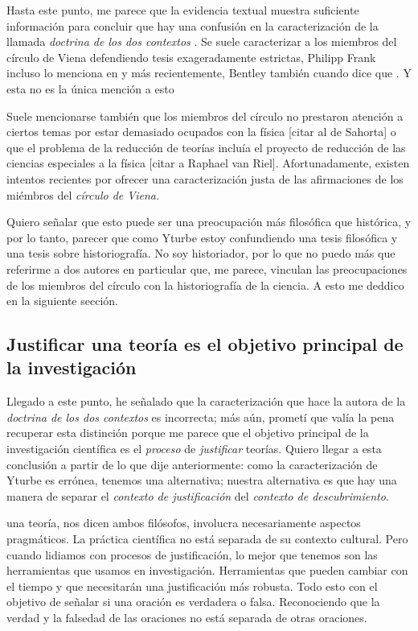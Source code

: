 Hasta este punto, me parece que la evidencia textual muestra suficiente información para concluir que hay una confusión en la caracterización de la llamada \emph{doctrina de los dos contextos} \parencite{Yturbe1995}.
Se suele caracterizar a los miembros del círculo de Viena defendiendo tesis exageradamente estrictas, Philipp Frank incluso lo menciona en  y más recientemente, Bentley también cuando dice que .
Y esta no es la única mención a esto 

Suele mencionarse también que los miembros del círculo no prestaron atención a ciertos temas por estar demasiado ocupados con la física [citar al de Sahorta] o que el problema de la reducción de teorías incluía el proyecto de reducción de las ciencias especiales a la física [citar a Raphael van Riel].
Afortunadamente, existen intentos recientes por ofrecer una caracterización justa de las afirmaciones de los miémbros del \emph{círculo de Viena.}

Quiero señalar que esto puede ser una preocupación más filosófica que histórica, y por lo tanto, parecer que como Yturbe \cite{Yturbe1995} estoy confundiendo una tesis filosófica y una tesis sobre historiografía.
No soy historiador, por lo que no puedo más que referirme a dos autores en particular que, me parece, vinculan las preocupaciones de los miembros del círculo con la historiografía de la ciencia.
A esto me deddico en la siguiente sección.


\subsection{Justificar una teoría es el objetivo principal de la investigación}

Llegado a este punto, he señalado que la caracterización que hace la autora de la \emph{doctrina de los dos contextos} es incorrecta; 
más aún, prometí que valía la pena recuperar esta distinción porque me parece que el objetivo principal de la investigación 
científica es el \emph{proceso} de \emph{justificar} teorías.
Quiero llegar a esta conclusión a partir de lo que dije anteriormente: como la caracterización de Yturbe es errónea, tenemos una alternativa; 
nuestra alternativa es que hay una manera de separar el \emph{contexto de justificación} del \emph{contexto de descubrimiento}.




 una teoría, nos dicen ambos filósofos, involucra necesariamente aspectos pragmáticos.
La práctica científica no está separada de su contexto cultural.
Pero cuando lidiamos con procesos de justificación, lo mejor que tenemos son las herramientas que usamos en investigación.
Herramientas que pueden cambiar con el tiempo y que necesitarán una justificación más robusta.
Todo esto con el objetivo de señalar si una oración es verdadera o falsa.
Reconociendo que la verdad y la falsedad de las oraciones no está separada de otras oraciones.

